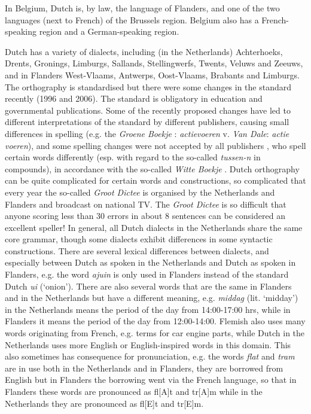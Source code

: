 \documentclass[]{../../metanetpaper}
\begin{document}
\begin{multicols}{2}
    In Belgium, Dutch is, by law, the language of Flanders, and one of the two languages (next to French) of the Brussels region.  Belgium also has a French-speaking region and a German-speaking region.

    Dutch has a variety of dialects, including (in the Netherlands) Achterhoeks, Drents, Gronings, Limburgs, Sallands, Stellingwerfs, Twents, Veluws and Zeeuws, and in Flanders West-Vlaams, Antwerps, Oost-Vlaams, Brabants and Limburgs. The orthography is standardised but there were some changes in the standard recently (1996 and 2006).  The standard is obligatory in education and governmental publications. Some of the recently proposed changes have led to different interpretations of the standard by different publishers, causing small differences in spelling (e.g.  the \textit{Groene Boekje} \cite{GroeneBoekje}: \textit{actievoeren} v. \textit{Van Dale}: \textit{actie voeren}), and some spelling changes were not accepted by all publishers \cite{Wittespellers}, who spell certain words differently (esp. with regard to the so-called \textit{tussen-n} in compounds), in accordance with the so-called \textit{Witte Boekje} \cite{Wittespelling}.  Dutch orthography can be quite complicated for certain words and constructions, so complicated that every year the so-called \textit{Groot Dictee} \cite{Grootdictee} is organised by the Netherlands and Flanders and broadcast on national TV. The \textit{Groot Dictee} is so difficult that anyone scoring less than 30 errors in about 8 sentences can be considered an excellent speller! In general, all Dutch dialects in the Netherlands share the same core grammar, though some dialects exhibit differences in some syntactic constructions. There are several  lexical differences between dialects, and especially between Dutch as spoken in the Netherlands and Dutch as spoken in Flanders, e.g. the word \textit{ajuin} is only used in Flanders instead of the standard Dutch \textit{ui} (`onion').  There are also several words that are the same in Flanders and in the Netherlands but have a different meaning, e.g. \textit{middag} (lit. `midday') in the Netherlands means the period of the day from 14:00-17:00 hrs, while in Flanders it means the period of the day from 12:00-14:00. Flemish also uses many words originating from French, e.g. terms for car engine parts, while Dutch in the Netherlands uses more English or English-inspired words in this domain. This also sometimes has consequence for pronunciation, e.g. the words \textit{flat} and \textit{tram} are in use both in the Netherlands and in Flanders, they are borrowed from English but in Flanders the borrowing went via the French language, so that in Flanders these words are pronounced as fl[A]t and tr[A]m while in the Netherlands they are pronounced as fl[E]t and tr[E]m.


\end{multicols}
\end{document}
